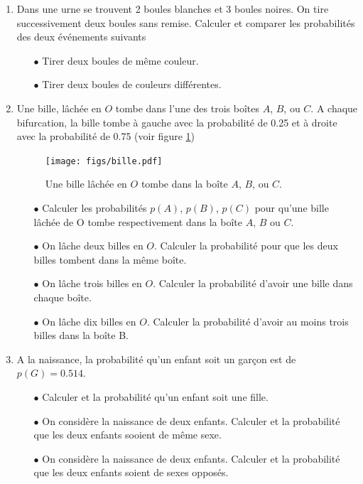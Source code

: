 \documentclass[a4paper,12pt]{book}
\begin{document}
\begin{enumerate}
 \item Dans une urne se trouvent 2 boules blanches et 3 boules noires. On tire successivement deux boules sans remise.
Calculer et comparer les probabilités des deux événements suivants
\begin{itemize}
 \item[$\bullet$] Tirer deux boules de même couleur.
 \item[$\bullet$] Tirer deux boules de couleurs différentes.
\end{itemize}
\item Une bille, lâchée en $O$ tombe dans l'une des trois boîtes $A$, $B$, ou $C$. A chaque bifurcation, la bille 
tombe à gauche avec la probabilité de 0.25 et à droite avec la probabilité de 0.75 (voir figure \ref{fig_bille})
\begin{figure}[htp]
\begin{center}
\texttt{[image: figs/bille.pdf]}
\end{center}
\caption{Une bille lâchée en $O$ tombe dans la boîte $A$, $B$, ou $C$.}\label{fig_bille}
\end{figure}
\begin{itemize}
 \item[$\bullet$] Calculer les probabilités $p(A)$, $p(B)$, $p(C)$ pour qu'une bille lâchée de O tombe respectivement 
dans la boîte $A$, $B$ ou $C$.
\item[$\bullet$] On lâche deux billes en $O$. Calculer la probabilité pour que les deux billes tombent dans la même boîte.
\item[$\bullet$] On lâche trois billes en $O$. Calculer la probabilité d'avoir une bille dans chaque boîte.
\item[$\bullet$] On lâche dix billes en $O$. Calculer la probabilité d'avoir au moins trois billes dans la boîte B.
\end{itemize}
\item A la naissance, la probabilité qu'un enfant soit un garçon
est de $p(G)=0.514$.
\begin{itemize}
 \item[$\bullet$] Calculer et la probabilité qu'un enfant soit une fille.
 \item[$\bullet$] On considère la naissance de deux enfants. Calculer et la probabilité que les deux enfants sooient de même sexe.
 \item[$\bullet$] On considère la naissance de deux enfants. Calculer et la probabilité que les deux enfants soient de sexes opposés.
\end{itemize}
\end{enumerate}
\end{document}
